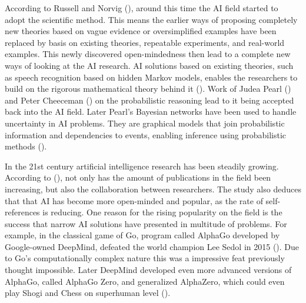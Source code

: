 \documentclass[utf8,english]{gradu3}
\begin{document}
According to Russell and Norvig (\cite*{norvig2002}), around this time the AI
field started to adopt the scientific method. This means the earlier ways of
proposing completely new theories based on vague evidence or oversimplified
examples have been replaced by basis on existing theories, repeatable
experiments, and real-world examples. This newly discovered open-mindedness then
lead to a complete new ways of looking at the AI research. AI solutions based on
existing theories, such as speech recognition based on hidden Markov models,
enables the researchers to build on the rigorous mathematical theory behind it
(\cite{norvig2002}). Work of Judea Pearl (\cite*{pearl1988}) and Peter Cheeceman
(\cite*{cheeseman1985}) on the probabilistic reasoning lead to it being accepted
back into the AI field. Later Pearl's Bayesian networks have been used to handle
uncertainty in AI problems. They are graphical models that join probabilistic
information and dependencies to events, enabling inference using probabilistic
methods (\cite{goertzel2007}).



In the 21st century artificial intelligence research has been steadily growing.
According to (\cite{liu2018}), not only has the amount of publications in the
field been increasing, but also the collaboration between researchers. The study
also deduces that that AI has become more open-minded and popular, as the rate
of self-references is reducing. One reason for the rising popularity on the
field is the success that narrow AI solutions have presented in multitude of
problems. For example, in the classical game of Go, program called AlphaGo
developed by Google-owned DeepMind, defeated the world champion Lee Sedol in
2015 (\cite{silver2016}). Due to Go's computationally complex nature this was a
impressive feat previously thought impossible. Later DeepMind developed even
more advanced versions of AlphaGo, called AlphaGo Zero, and generalized
AlphaZero, which could even play Shogi and Chess on superhuman level
(\cite{silver2018}).
\end{document}
